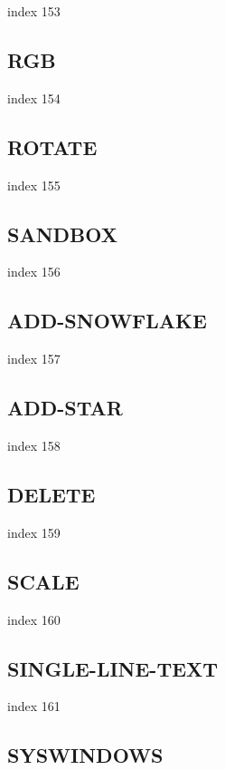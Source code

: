 \documentclass[a4paper]{report}
\begin{document}
index 153

\subsection{RGB}

 index 154

\subsection{ROTATE}

index 155

\subsection{SANDBOX}

index 156

\subsection{ADD-SNOWFLAKE}

index 157

\subsection{ADD-STAR}

index 158

\subsection{DELETE}

index 159

\subsection{SCALE}

index 160

\subsection{SINGLE-LINE-TEXT}

index 161

\subsection{SYSWINDOWS}
\end{document}
